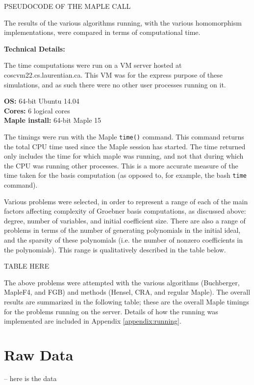 \documentclass[letterpaper,12pt,titlepage,oneside,final]{book}
\begin{document}
PSEUDOCODE OF THE MAPLE CALL

The results of the various algorithms running, with the various homomorphism implementations, were compared in terms of computational time.  

\noindent \textbf{Technical Details:}

The time computations were run on a VM server hosted at coscvm22.cs.laurentian.ca.  This VM was for the express purpose of these simulations, and as such there were no other user processes running on it.

\noindent \textbf{OS:} 64-bit Ubuntu 14.04\\
\textbf{Cores:} 6 logical cores\\
\textbf{Maple install:} 64-bit Maple 15

The timings were run with the Maple \texttt{time()} command.  This command returns the total CPU time used since the Maple session has started.  The time returned only includes the time for which maple was running, and not that during which the CPU was running other processes.  This is a more accurate measure of the time taken for the basis computation (as opposed to, for example, the bash \texttt{time} command).

Various problems were selected, in order to represent a range of each of the main factors affecting complexity of Groebner basis computations, as discussed above: degree, number of variables, and initial coefficient size.  There are also a range of problems in terms of the number of generating polynomials in the initial ideal, and the sparsity of these polynomials (i.e. the number of nonzero coefficients in the polynomials).  This range is qualitatively described in the table below.

TABLE HERE

The above problems were attempted with the various algorithms (Buchberger, MapleF4, and FGB) and methods (Hensel, CRA, and regular Maple).  The overall results are summarized in the following table; these are the overall Maple timings for the problems running on the server.  Details of how the running was implemented are included in Appendix \ref{appendix:running}.

\section{Raw Data}

-- here is the data
\end{document}
